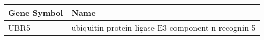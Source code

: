 \begin{tabular}{ll}
\toprule
Gene Symbol &                                               Name \\
\midrule
       UBR5 & ubiquitin protein ligase E3 component n-recognin 5 \\
\bottomrule
\end{tabular}
